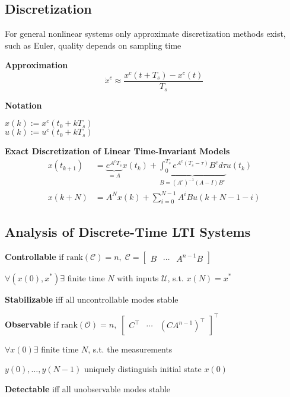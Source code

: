 \subsection{Discretization}

For general nonlinear systems only approximate discretization methods
exist, such as Euler, quality depends on sampling time

\begin{minipage}[t]{0.5\linewidth}
	\textbf{Approximation}\\
	\[
		\dot{x}^c \approx \frac{x^c(t + T_s)-x^c(t)}{T_s}
	\]
\end{minipage}
\begin{minipage}[t]{0.45\linewidth}
	\textbf{Notation}

	$x(k):= x^c(t_0+kT_s)$\\
	$u(k):= u^c(t_0+kT_s)$\\
\end{minipage}

\textbf{Exact Discretization of Linear Time-Invariant Models}
%
\begin{align*}
	x(t_{k+1}) & =
	\underbrace{e^{A^c T_s}}
	_{=A} x(t_k) +
	\underbrace{\textstyle\int_{0}^{T_s}
		e^{A^c(T_s - \tau)}B^c d\tau}
	_{B=(A^c)^{-1}(A-I)B^c} u(t_k)
	\\
	x(k+N)     & = A^N x(k) + \textstyle\sum_{i=0}^{N-1}
	A^i B u(k+N-1-i)
\end{align*}

\subsection{Analysis of Discrete-Time LTI Systems}

\textbf{Controllable}
$
	\text{if rank}(\mathcal{C}) = n
	,\;
	\mathcal{C} =
	\begin{bmatrix}
		B & \cdots & A^{n-1} B
	\end{bmatrix}
$

$\forall(x(0),x^*)\exists$ finite time $N$
with inputs $\mathcal{U}$, s.t. $x(N)=x^*$

\textbf{Stabilizable} iff all uncontrollable modes stable

\textbf{Observable}
$
	\text{if rank}(\mathcal{O}) = n
	,\;
	\begin{bmatrix}
		C^\top & \cdots & (CA^{n-1})^\top
	\end{bmatrix}^\top
$

$\forall x(0)\exists$ finite time $N$, s.t. the measurements

$y(0), \dots, y(N-1)$
uniquely distinguish initial state $x(0)$

\textbf{Detectable} iff all unobservable modes stable

